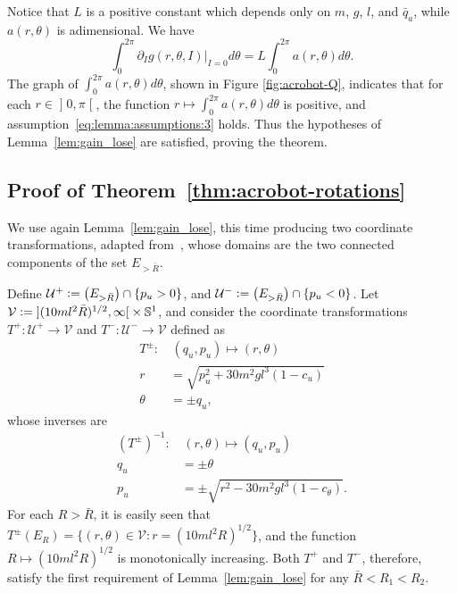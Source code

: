 \documentclass[journal,twoside,web, twocolumn,draftcls]{ieeecolor}
\newcommand*{\Sone}{\mathbb{S}^1}
\newcommand*{\cU}{\mathcal{U}}
\newcommand*{\cV}{\mathcal{V}}
\newcommand*{\eqdef}{\vcentcolon=}
\begin{document}
%
Notice that \(L\) is a positive constant which depends only on \(m\), \(g\), \(l\), and \(\bar{q}_a\), while \(a(r,\theta)\) is adimensional. We have
\[
\int_0^{2\pi} \partial_I g(r,\theta,I) \big|_{I=0} d \theta =L \int_0^{2\pi} a(r,\theta) d\theta.
\]
The graph of \(\int_0^{2\pi} a(r,\theta) d\theta\), shown in
Figure \ref{fig:acrobot-Q}, indicates that for each $r \in \mathopen] 0,\pi\mathclose[$, the function $r \mapsto \int_0^{2\pi} a(r,\theta) d\theta$ is positive, and assumption~\eqref{eq:lemma:assumptions:3} holds. Thus the hypotheses of Lemma~\ref{lem:gain_lose} are satisfied, proving the theorem.
\hfill\QED


\subsection{Proof of Theorem~\ref{thm:acrobot-rotations}}

We use again Lemma~\ref{lem:gain_lose}, this time producing two coordinate transformations, adapted from~\cite{dynamic_vhcs_stabilize_closed_orbits}, whose domains are the two connected components of the set $E_{>\bar R}$.


Define $\cU^+ \eqdef \big(E_{>\bar R}\big) \cap \{ p_u >0\}$, and $\cU^- \eqdef \big(E_{>\bar R}\big) \cap \{ p_u <0\}$. Let $\cV \eqdef \mathopen] (10 m l^2 \bar R)^{1/2}, \infty \mathclose[ \times \Sone$, and consider the coordinate transformations $T^+ : \cU^+ \to \cV$ and $T^- : \cU^- \to\cV$ defined as
\begin{equation}\label{eq:T2}
\begin{aligned}
T^\pm: & \, (q_u,p_u) \mapsto (r,\theta) \\
%
r &= \sqrt{p_u^2 + 30m^2gl^3(1-c_u)} \\
%
\theta &= \pm q_u,
\end{aligned}
\end{equation}
whose inverses are
\[
\begin{aligned}
(T^\pm)^{-1}: & \, (r,\theta) \mapsto (q_u,p_u)\\
%
q_u &= \pm \theta \\
% 
p_u &= \pm \sqrt{r^2-30m^2gl^3(1-c_\theta)}.
\end{aligned}
\]
For each $R> \bar R$, it is easily seen that $T^\pm(E_R) = \{(r,\theta) \in \cV : r = (10 m l^2 R)^{1/2}\}$, and the function $R \mapsto (10 m l^2 R)^{1/2}$ is monotonically increasing. Both $T^+$ and $T^-$, therefore, satisfy the first requirement of Lemma~\ref{lem:gain_lose} for any $\bar R < R_1 < R_2$. 
\end{document}
